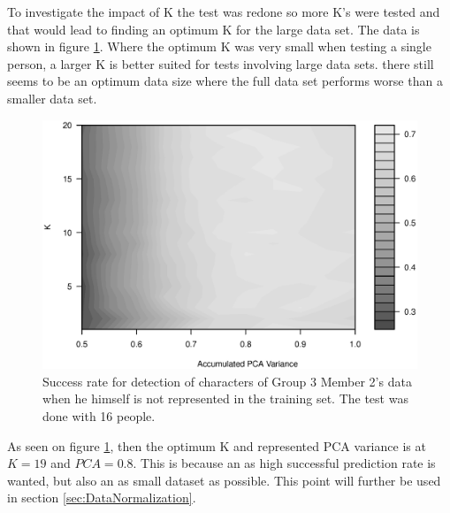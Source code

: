 To investigate the impact of K the test was redone so more K's were tested and that would lead to finding an optimum K for the large data set.
The data is shown in figure \ref{fig:k_v_PCA}. 
Where the optimum K was very small when testing a single person, a larger K is better suited for tests involving large data sets.
there still seems to be an optimum data size where the full data set performs worse than a smaller data set. 

\begin{figure}[H]
\centering
\includegraphics[width = \textwidth]{graphics/contour_k_PCA_oneVsRest}
\caption[Detailed PCA performance]{Success rate for detection of characters of Group 3 Member 2's data when he himself is not represented in the training set. 
The test was done with 16 people.}
\label{fig:k_v_PCA}
\end{figure}

As seen on figure \ref{fig:k_v_PCA}, then the optimum K and represented PCA variance is at $K = 19$ and $PCA = 0.8$. 
This is because an as high successful prediction rate is wanted, but also an as small dataset as possible. 
This point will further be used in section \ref{sec:DataNormalization}.





